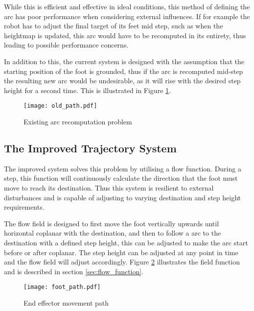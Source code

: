             While this is efficient and effective in ideal conditions, this method of defining the arc has poor performance when considering external influences. If for example the robot has to adjust the final target of its feet mid step, such as when the heightmap is updated, this arc would have to be recomputed in its entirety, thus leading to possible performance concerns.

            In addition to this, the current system is designed with the assumption that the starting position of the foot is grounded, thus if the arc is recomputed
            mid-step the resulting new arc would be undesirable, as it will rise with the desired step height for a second time. This is illustrated in Figure \ref{fig:old_arc}.

            \begin{figure}[h]
                \centering
                \hspace{-1.38cm}
                \texttt{[image: old\_path.pdf]}
                \caption{Existing arc recomputation problem}
                \label{fig:old_arc}
            \end{figure}

        \newpage
        \subsection{The Improved Trajectory System} \label{sec:imporved}
            The improved system solves this problem by utilising a flow function. During a step, this function will continuously calculate the
            direction that the foot must move to reach its destination. Thus this system is resilient to external disturbances and is capable of adjusting to
            varying destination and step height requirements. 
            
            The flow field is designed to first move the foot vertically upwards until horizontal coplanar with the destination, and then to follow a
            arc to the destination with a defined step height, this can be adjusted to make the arc start before or after coplanar. The step height can be adjusted at any point in time and the flow field will adjust accordingly.
            Figure \ref{fig:foot_arc} illustrates the field function and is described in section \ref{sec:flow_function}.
            \begin{figure}[h]
                \centering
                \hspace{-1.38cm}
                \texttt{[image: foot\_path.pdf]}
                \caption{End effector movement path}
                \label{fig:foot_arc}
            \end{figure}

